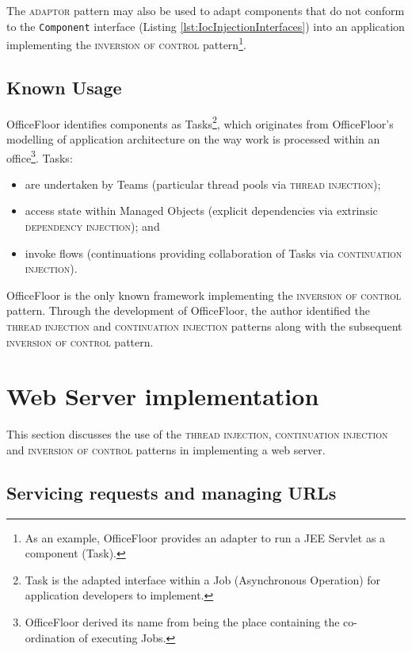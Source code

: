 \documentclass[prodmode]{style/acmlarge}
\begin{document}
The \textsc{adaptor} pattern may also be used to adapt components that do not
conform to the \texttt{Component} interface (Listing
\ref{lst:IocInjectionInterfaces}) into an application implementing the
\textsc{inversion of control} pattern\footnote{As an example, OfficeFloor
\cite{officefloor} provides an adapter to run a JEE Servlet as a component
(Task).}.


\subsection{Known Usage}

OfficeFloor \cite{officefloor} identifies components as Tasks\footnote{Task is
the adapted interface within a Job (Asynchronous Operation) for application
developers to implement.}, which originates from OfficeFloor's modelling of
application architecture on the way work is processed within an
office\footnote{OfficeFloor derived its name from being the place containing the
co-ordination of executing Jobs.}.  Tasks:
\begin{itemize}
  \item are undertaken by Teams (particular thread pools via \textsc{thread injection});
  \item access state within Managed Objects (explicit dependencies via extrinsic \textsc{dependency injection}); and
  \item invoke flows (continuations providing collaboration of Tasks via \textsc{continuation injection}).
\end{itemize}

OfficeFloor is the only known framework implementing the \textsc{inversion of
control} pattern.  Through the development of OfficeFloor, the author identified
the \textsc{thread injection} and \textsc{continuation injection} patterns along
with the subsequent \textsc{inversion of control} pattern.



\section{Web Server implementation}

This section discusses the use of the \textsc{thread injection},
\textsc{continuation injection} and \textsc{inversion of control} patterns in
implementing a web server.


\subsection{Servicing requests and managing URLs}
\end{document}
